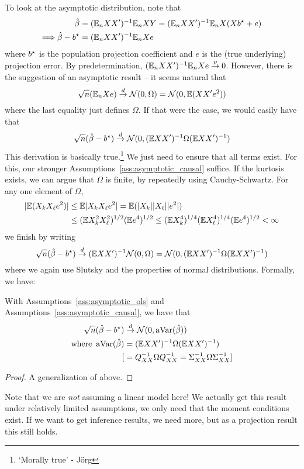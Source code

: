 \documentclass[10pt]{article}
\begin{document}
To look at the asymptotic distribution, note that
\begin{align*}
	\hat{\beta} &= (\mathbb{E}_n XX')^{-1} \mathbb{E}_n XY = (\mathbb{E}_n XX')^{-1} \mathbb{E}_n X(Xb^\star + e) \\ \Longrightarrow \hat{\beta} - b^\star &= (\mathbb{E}_n XX')^{-1}\mathbb{E}_n Xe 
\end{align*}
where $b^\star$ is the population projection coefficient and $e$ is the (true underlying) projection error. By predetermination, $(\mathbb{E}_n XX')^{-1}\mathbb{E}_n Xe \overset{p}{\to} 0$. However, there is the suggestion of an asymptotic result -- it seems natural that \[\sqrt{n}(\mathbb{E}_n Xe) \overset{d}{\to} \mathcal{N}(0,\Omega) = \mathcal{N}(0,\mathbb{E}(XX'e^2))\]where the last equality just defines $\Omega$. If that were the case, we would easily have that \[\sqrt{n}(\hat{\beta} - b^\star) \overset{d}{\to} \mathcal{N}(0,(\mathbb{E} XX')^{-1}\Omega (\mathbb{E} XX')^{-1})\]This derivation is basically true.\footnote{`Morally true' - J\"{o}rg} We just need to ensure that all terms exist. For this, our stronger Assumptions~\ref{ass:asymptotic_causal} suffice. If the kurtosis exists, we can argue that $\Omega$ is finite, by repeatedly using Cauchy-Schwartz. For any one element of $\Omega$,
\begin{align*}
	|\mathbb{E} (X_kX_\ell e^2)| &\le \mathbb{E} |X_kX_\ell e^2| = \mathbb{E} ( |X_k||X_\ell| |e^2|) \\&\le (\mathbb{E} X_k^2 X_\ell^2)^{1/2} (\mathbb{E} e^4)^{1/2} \le (\mathbb{E} X_k^4)^{1/4} (\mathbb{E} X_\ell^4)^{1/4} (\mathbb{E} e^4)^{1/2} < \infty
\end{align*}
we finish by writing \[\sqrt{n}(\hat{\beta} - b^\star) \overset{d}{\to} (\mathbb{E} XX')^{-1}\mathcal{N}(0,\Omega) = \mathcal{N} (0,(\mathbb{E} XX')^{-1} \Omega (\mathbb{E} XX')^{-1})\]
where we again use Slutsky and the properties of normal distributions. Formally, we have:

\begin{theorem}
	With Assumptions~\ref{ass:asymptotic_ols} and Assumptions~\ref{ass:asymptotic_causal}, we have that 
	\begin{align*}
		\sqrt{n}(\hat{\beta} - b^\star) &\overset{d}{\to} \mathcal{N}(0,\mathop{\rm aVar}(\hat{\beta})) \\
		\text{where } \mathop{\rm aVar}(\hat{\beta}) &= (\mathbb{E} XX')^{-1} \Omega (\mathbb{E} XX')^{-1}) \\ [&= Q_{XX}^{-1} \Omega Q_{XX}^{-1} = \Sigma_{XX}^{-1} \Omega \Sigma_{XX}^{-1}]
	\end{align*}
\end{theorem}
\begin{proof}
	A generalization of above.
\end{proof}
\begin{remark}
	Note that we are \emph{not} assuming a linear model here! We actually get this result under relatively limited assumptions, we only need that the moment conditions exist. If we want to get inference results, we need more, but as a projection result this still holds.
\end{remark}
\end{document}
